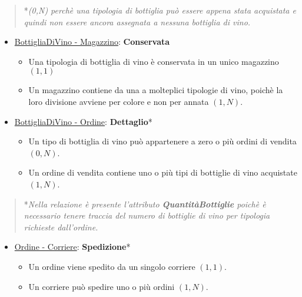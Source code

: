 \begin{verse}
	*\emph{(0,N) perchè una tipologia di bottiglia può essere appena stata acquistata e quindi non essere ancora assegnata a nessuna bottiglia di vino.}
\end{verse}

\begin{itemize}
	\item \underline{BottigliaDiVino - Magazzino}: \textbf{Conservata}
	
	\begin{itemize}
		\item Una tipologia di bottiglia di vino è conservata in un unico magazzino $(1,1)$
		\item Un magazzino contiene da una a molteplici tipologie di vino, poichè la loro divisione avviene per colore e non per annata $(1,N)$.
	\end{itemize}
	
\end{itemize}

\begin{itemize}
	\item \underline{BottigliaDiVino - Ordine}: \textbf{Dettaglio}*
	
	\begin{itemize}
		\item Un tipo di bottiglia di vino può appartenere a zero o più ordini di vendita $(0,N)$.
		\item Un ordine di vendita contiene uno o più tipi di bottiglie di vino acquistate $(1,N)$.
	\end{itemize}
	
\end{itemize}

\begin{verse}
	*\emph{Nella relazione è presente l'attributo \textbf{QuantitàBottiglie} poichè è necessario tenere traccia del numero di bottiglie di vino per tipologia richieste dall'ordine.}
\end{verse}

\begin{itemize}
	\item \underline{Ordine - Corriere}: \textbf{Spedizione}*
	
	\begin{itemize}
		\item Un ordine viene spedito da un singolo corriere $(1,1)$.
		\item Un corriere può spedire uno o più ordini $(1,N)$.
	\end{itemize}
	
\end{itemize}

